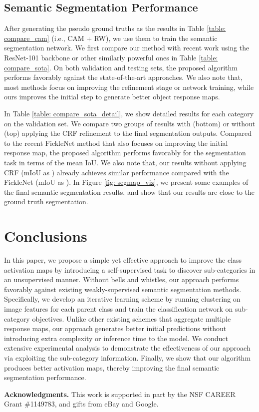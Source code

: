 \documentclass[10pt,twocolumn,letterpaper]{article}
\begin{document}
 \vspace{-2mm}
\subsection{Semantic Segmentation Performance}
After generating the pseudo ground truths as the results in Table \ref{table: compare_cam} (i.e., CAM + RW), we use them to train the semantic segmentation network.
We first compare our method with recent work using the ResNet-101 backbone or other similarly powerful ones in Table \ref{table: compare_sota}.
On both validation and testing sets, the proposed algorithm performs favorably against the  state-of-the-art approaches.
We also note that, most methods focus on improving the refinement stage or network training, while ours improves the initial step to generate better object response maps.


In Table \ref{table: compare_sota_detail}, we show detailed results for each category on the validation set.
We compare two groups of results with (bottom) or without (top) applying the CRF \cite{crf} refinement to the final segmentation outputs.
Compared to the recent FickleNet \cite{lee2019ficklenet} method that also focuses on improving the initial response map, the proposed algorithm performs favorably for the segmentation task in terms of the mean IoU.
We also note that, our results without applying CRF (mIoU as ) already achieves similar performance compared with the FickleNet (mIoU as ).
In Figure \ref{fig: segmap_viz}, we present some examples of the final semantic segmentation results, and show that our results are close to the ground truth segmentation.






\section{Conclusions}
In this paper, we propose a simple yet effective approach to improve the class activation maps by introducing a self-supervised task to discover sub-categories in an unsupervised manner. Without bells and whistles, our approach performs favorably against existing weakly-supervised semantic segmentation methods.
Specifically, we develop an iterative learning scheme by running clustering on image features for each parent class and train the classification network on sub-category objectives.
Unlike other existing schemes that aggregate multiple response maps, our approach generates better initial predictions without introducing extra complexity or inference time to the model.
We conduct extensive experimental analysis to demonstrate the effectiveness of our approach via exploiting the sub-category information.
Finally, we show that our algorithm produces better activation maps, thereby improving the final semantic segmentation performance.


\vspace{-3mm}
{\flushleft \bf{Acknowledgments.}}
This work is supported in part by the NSF CAREER Grant \#1149783, and gifts from eBay and Google.

{\small


}
\end{document}
